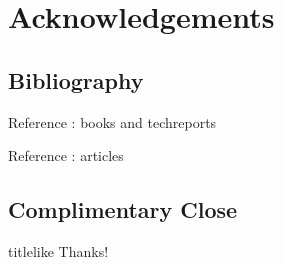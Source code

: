 \documentclass[english]{pkuslide}
\begin{document}
\section{Acknowledgements}
\subsection{Bibliography}
	\begin{frame}{Reference : books and techreports}
\printbibliography[type = book]
\printbibliography[keyword = aaa]
	\end{frame}
\begin{frame}{Reference : articles}
\printbibliography[type = article]
	\end{frame}

\subsection{Complimentary Close}

	\begin{frame}
\LARGE
\begin{beamercolorbox}[center, ht=3em]{titlelike}
\vspace{1em}
Thanks!
\end{beamercolorbox}
	\end{frame}

	
\end{document}
